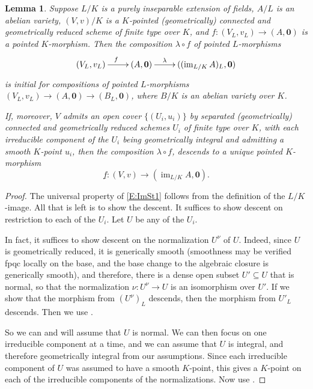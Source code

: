 \documentclass[11pt, reqno]{amsart}
\numberwithin{equation}{section}
\newtheorem{lem}[teo]{Lemma}
\theoremstyle{definition}
\theoremstyle{remark}
\DeclareMathOperator{\im}{im}
\newcommand{\ubar}[1]{{\underline{#1}}}
\begin{document}
 
\begin{lem}\label{L:ImAbVarSt}
  Suppose  $L/K$ is a purely inseparable extension of fields, $A/L$ is
  an abelian variety, $(V,v)/K$ is a $K$-pointed (geometrically) connected
  and geometrically reduced scheme of finite type over $K$, and $f:(V_L,v_L)\to (A,\mathbf 0)$ is a pointed $K$-morphism.  
   Then the composition $\lambda \circ f$ of  pointed $L$-morphisms
\begin{equation}\label{E:ImSt1}
\xymatrix{
(V_L,v_L)\ar[r]^f & (A,\mathbf 0) \ar[r]^<>(0.5)\lambda &((\im_{L/K}A)_L,\mathbf 0)
}
\end{equation}
is initial for compositions of pointed $L$-morphisms $(V_L,v_L)\to (A,\mathbf 0 )\to (B_L,\mathbf 0)$, where $B/K$ is an abelian variety over $K$.

 If, moreover, $V$ admits an open cover $\{(U_i,u_i)\}$ by separated  (geometrically) connected
  and geometrically reduced schemes $U_i$ of finite type over $K$, with each irreducible component of the $U_i$ being geometrically integral and admitting a smooth $K$-point $u_i$,
   then 
the composition $\lambda\circ f$, 
descends to a unique pointed $K$-morphism $$\ubar f:(V,v)\longrightarrow (\im_{L/K}A,\mathbf 0).$$  
  \end{lem}

\begin{proof}
The universal property of \eqref{E:ImSt1} follows from the definition of the $L/K$-image.  All that is left is to show the descent. It suffices to show descent on restriction to each of the $U_i$.  Let $U$ be any of the $U_i$.  

 In fact, it suffices to show descent on the normalization $U^\nu$ of
 $U$.  Indeed, since $U$ is geometrically reduced, it is generically
 smooth (smoothness may be verified fpqc locally on the base, and the base change to the algebraic closure is generically smooth), and therefore, there is a dense open subset $U'\subseteq U$ that is normal, so that the normalization $\nu:U^\nu\to U$ is an isomorphism over $U'$.  If we show that  the morphism from $(U^\nu)_L$ descends, then the morphism from $U'_L$ descends.  Then we use .
 
   So we can and will assume that $U$ is normal.  We can then focus on one irreducible component at a time, and we can assume that $U$ is integral, and therefore geometrically integral from our assumptions.  Since each irreducible component of $U$ was assumed to have a smooth $K$-point, this gives a $K$-point on each of the irreducible components of the normalizations.  Now use .
 \end{proof}
\end{document}
